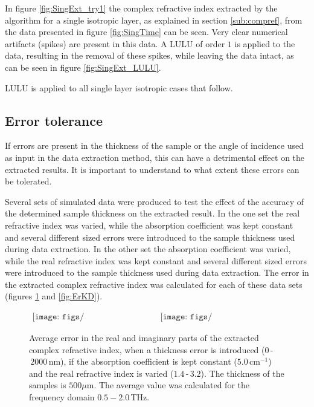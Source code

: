In figure \ref{fig:SingExt_try1} the complex refractive index extracted by the algorithm for a single isotropic layer, as explained in section \ref{sub:compref}, from the data presented in figure \ref{fig:SingTime} can be seen. Very clear numerical artifacts (spikes) are present in this data. A LULU of order $1$ is applied to the data, resulting in the removal of these spikes, while leaving the data intact, as can be seen in figure \ref{fig:SingExt_LULU}.

LULU is applied to all single layer isotropic cases that follow. 

\subsection{Error tolerance}
\label{sub:Error}

If errors are present in the thickness of the sample or the angle of incidence used as input in the data extraction method, this can have a detrimental effect on the extracted results. It is important to understand to what extent these errors can be tolerated.

Several sets of simulated data were produced to test the effect of the accuracy of the determined sample thickness on the extracted result. In the one set the real refractive index was varied, while the absorption coefficient was kept constant and several different sized errors were introduced to the sample thickness used during data extraction. In the other set the absorption coefficient was varied, while the real refractive index was kept constant and several different sized errors were introduced to the sample thickness used during data extraction. The error in the extracted complex refractive index was calculated for each of these data sets (figures \ref{fig:ErND} and \ref{fig:ErKD}).

\begin{figure}[H]
                \begin{center}$
								\begin{array}{cc}
                \texttt{[image: figs/n\_err\_d\_shift\_n\_change.png]}&
                \texttt{[image: figs/k\_err\_d\_shift\_n\_change.png]}
								\end{array}$
								\end{center}
	\caption[Error in extracted complex refractive index for constant absorption coefficient, varied real refractive index and multiple thickness errors]{Average error in the real and imaginary parts of the extracted complex refractive index, when a thickness error is introduced ($0\,$-$\,2000\,$nm), if the absorption coefficient is kept constant ($5.0\,\text{cm}^{-1}$) and the real refractive index is varied ($1.4\,$-$\,3.2$). The thickness of the samples is $500\mu$m. The average value was calculated for the frequency domain $0.5-2.0\,$THz.}
	\label{fig:ErND}
\end{figure}

